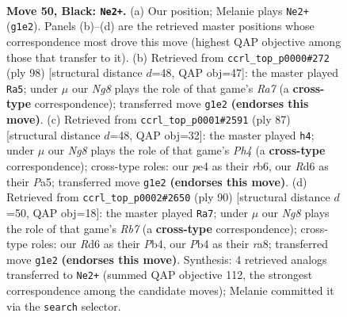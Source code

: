 \documentclass[11pt]{article}
\begin{document}
\clearpage

\begin{figure}[p]\centering
\begin{subfigure}{0.46\textwidth}\centering
\resizebox{\linewidth}{!}{%
\newchessgame
\chessboard[
  setfen={8/7p/3r1p1k/6R1/1p2PKP1/7b/6r1/6n1 b - - 4 50},
  showmover=false,
  pgfstyle=straightmove, color=movearrow, markmove={g1-e2}
]}
\caption{}
\end{subfigure}\hfill
\begin{subfigure}{0.46\textwidth}\centering
\resizebox{\linewidth}{!}{%
\newchessgame
\chessboard[
  setfen={8/R2R1pk1/2r5/6p1/5r2/5PK1/6P1/8 w - - 4 50},
  showmover=false,
  pgfstyle=straightmove, color=movearrow, markmove={a7-a5}
]}
\caption{}
\end{subfigure}
\\[4pt]
\begin{subfigure}{0.46\textwidth}\centering
\resizebox{\linewidth}{!}{%
\newchessgame
\chessboard[
  setfen={8/1p3pk1/1R6/p4K1p/2R2P2/8/3b1r2/8 b - - 2 44},
  showmover=false,
  pgfstyle=straightmove, color=movearrow, markmove={h5-h4}
]}
\caption{}
\end{subfigure}\hfill
\begin{subfigure}{0.46\textwidth}\centering
\resizebox{\linewidth}{!}{%
\newchessgame
\chessboard[
  setfen={r7/1RR3pk/7p/7P/KP6/P5r1/8/8 w - - 8 46},
  showmover=false,
  pgfstyle=straightmove, color=movearrow, markmove={b7-a7}
]}
\caption{}
\end{subfigure}
\caption{\textbf{Move 50, Black: \texttt{Ne2+}.} (a) Our position; Melanie plays \texttt{Ne2+} (\texttt{g1e2}). Panels (b)--(d) are the retrieved master positions whose correspondence most drove this move (highest QAP objective among those that transfer to it). (b) Retrieved from \texttt{ccrl\_top\_p0000\#272} (ply 98) [structural distance $d$=48, QAP obj=47]: the master played \texttt{Ra5}; under $\mu$ our \emph{Ng8} plays the role of that game's \emph{Ra7} (a \textbf{cross-type} correspondence); transferred move \texttt{g1e2} \textbf{(endorses this move)}. (c) Retrieved from \texttt{ccrl\_top\_p0001\#2591} (ply 87) [structural distance $d$=48, QAP obj=32]: the master played \texttt{h4}; under $\mu$ our \emph{Ng8} plays the role of that game's \emph{Ph4} (a \textbf{cross-type} correspondence); cross-type roles: our \emph{p}e4 as their \emph{r}b6, our \emph{R}d6 as their \emph{P}a5; transferred move \texttt{g1e2} \textbf{(endorses this move)}. (d) Retrieved from \texttt{ccrl\_top\_p0002\#2650} (ply 90) [structural distance $d$=50, QAP obj=18]: the master played \texttt{Ra7}; under $\mu$ our \emph{Ng8} plays the role of that game's \emph{Rb7} (a \textbf{cross-type} correspondence); cross-type roles: our \emph{R}d6 as their \emph{P}b4, our \emph{P}b4 as their \emph{r}a8; transferred move \texttt{g1e2} \textbf{(endorses this move)}. Synthesis: 4 retrieved analogs transferred to \texttt{Ne2+} (summed QAP objective 112, the strongest correspondence among the candidate moves); Melanie committed it via the \texttt{search} selector.}
\label{fig:thought-m99}
\end{figure}
\end{document}
